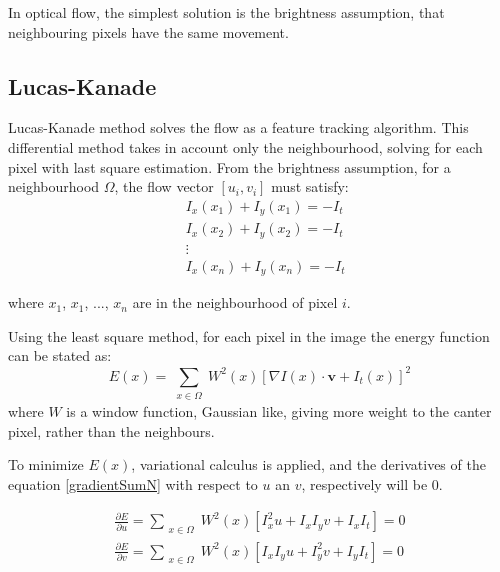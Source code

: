 \documentclass[12pt,a4paper,twoside]{report}
\begin{document}
In optical flow, the simplest solution is the brightness assumption, that neighbouring pixels have the same movement.

\subsection{Lucas-Kanade}
Lucas-Kanade method solves the flow as a feature tracking algorithm. This differential method takes in account only the neighbourhood, solving for each pixel with last square estimation. From the brightness assumption, for a neighbourhood $\Omega$, the flow vector $[u_i,v_i]$ must satisfy: 
\begin{equation}
\begin{split}
	&I_x(x_1)+I_y(x_1) = - I_t	\\
	&I_x(x_2)+I_y(x_2) = - I_t \\
	&\vdots \\
	&I_x(x_n)+I_y(x_n) = - I_t 
	\end{split}
\end{equation} 

where $x_1$, $x_1$,  $...$,  $x_n$ are in the neighbourhood of pixel $i$.

Using the least square method, for each pixel in the image the energy function can be stated as:
\begin{equation} \label{gradientSumN}
	E(x) = \sum_{\substack{x \in \Omega}}
	 W^2(x)[\nabla I(x)\cdot \boldsymbol{v}+I_t(x)]^2
\end{equation}
where $W$ is a window function, Gaussian like, giving more weight to the canter pixel, rather than the neighbours.

To minimize $E(x)$, variational calculus is applied, and the derivatives of the equation \ref{gradientSumN} with respect to $u$ an $v$, respectively will be 0.

\begin{equation}
	\begin{split}
	\frac{\partial E}{\partial u} =  \sum_{\substack{x \in \Omega}}
	W^2(x)[I_x^2 u + I_x I_y v + I_x I_t] = 0 \\ 
	\frac{\partial E}{\partial v} =  \sum_{\substack{x \in \Omega}}
	W^2(x)[ I_x I_y u + I_y^2 v + I_y I_t]  = 0
	\end{split}
\end{equation}
\end{document}
